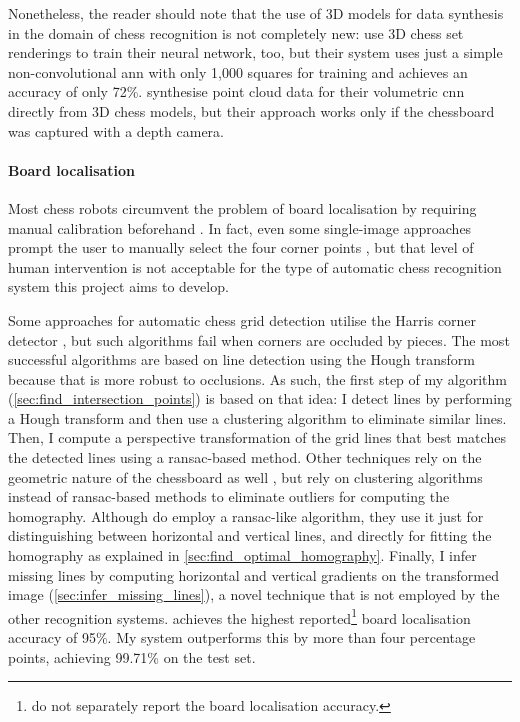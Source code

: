 \documentclass[../report.tex]{subfiles}
\begin{document}
Nonetheless, the reader should note that the use of 3D models for data synthesis in the domain of chess recognition is not completely new:
\textcite{hou} use 3D chess set renderings to train their neural network, too, but their system uses just a simple non-convolutional \gls{ann} with only 1,000 squares for training and achieves an accuracy of only 72\%.
\textcite{wei2017} synthesise point cloud data for their volumetric \gls{cnn} directly from 3D chess models, but their approach works only if the chessboard was captured with a depth camera.

\paragraph{Board localisation}
Most chess robots circumvent the problem of board localisation by requiring manual calibration beforehand \cite{goncalves2005,sokic2008,khan2014}.
In fact, even some single-image approaches prompt the user to manually select the four corner points \cite{danner2015}, but that level of human intervention is not acceptable for the type of automatic chess recognition system this project aims to develop.

Some approaches for automatic chess grid detection utilise the Harris corner detector \cite{banerjee2012,hack2014}, but such algorithms fail when corners are occluded by pieces.
The most successful algorithms are based on line detection using the Hough transform \cite{tam2008,neufeld2010,danner2015,chen2016,kanchibail2016,xie2018a,chen2019} because that is more robust to occlusions.
As such, the first step of my algorithm (\cref{sec:find_intersection_points}) is based on that idea: I detect lines by performing a Hough transform and then use a clustering algorithm to eliminate similar lines.
Then, I compute a perspective transformation of the grid lines that best matches the detected lines using a \gls{ransac}-based method.
Other techniques rely on the geometric nature of the chessboard as well \cite{tam2008,hack2014,danner2015,xie2018}, but rely on clustering algorithms instead of \gls{ransac}-based methods to eliminate outliers for computing the homography.
Although \textcite{hack2014} do employ a \gls{ransac}-like algorithm, they use it just for distinguishing between horizontal and vertical lines, and directly for fitting the homography as explained in \cref{sec:find_optimal_homography}.
Finally, I infer missing lines by computing horizontal and vertical gradients on the transformed image (\cref{sec:infer_missing_lines}), a novel technique that is not employed by the other recognition systems.
\Textcite{czyzewski2020} achieves the highest reported\footnote{ do not separately report the board localisation accuracy.} board localisation accuracy of 95\%.
My system outperforms this by more than four percentage points, achieving 99.71\% on the test set.
\end{document}
